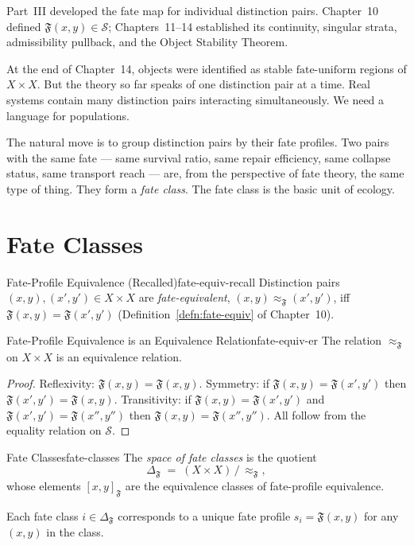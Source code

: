 \documentclass[12pt,twoside,openright]{book}
\newcommand{\fateClasses}{\Delta_{\mathfrak{F}}}
\newcommand{\fateMap}{\mathfrak{F}}
\newcommand{\fateSpace}{\mathcal{S}}
\newcommand{\fateClass}[1]{[#1]_{\mathfrak{F}}}
\newcommand{\fateUnif}{\text{fate-uniform}}
\providecommand{\fateUnif}{\text{fate-uniform}}
\providecommand{\fateClasses}{\Delta_{\mathfrak{F}}}
\providecommand{\fateClass}[1]{[#1]_{\mathfrak{F}}}
\begin{document}
Part~III developed the fate map for individual distinction
pairs. Chapter~10 defined $\fateMap(x,y)\in\fateSpace$;
Chapters~11--14 established its continuity, singular strata,
admissibility pullback, and the Object Stability Theorem.

At the end of Chapter~14, objects were identified as stable
$\fateUnif$ regions of $X\times X$. But the theory so far
speaks of one distinction pair at a time. Real systems contain
many distinction pairs interacting simultaneously. We need
a language for populations.

The natural move is to group distinction pairs by their fate
profiles. Two pairs with the same fate --- same survival ratio,
same repair efficiency, same collapse status, same transport
reach --- are, from the perspective of fate theory, the same
type of thing. They form a \emph{fate class}. The fate class
is the basic unit of ecology.

\section{Fate Classes}

\begin{definition}{Fate-Profile Equivalence (Recalled)}{fate-equiv-recall}
Distinction pairs $(x,y),(x',y')\in X\times X$ are
\emph{fate-equivalent}, $(x,y)\approx_\fateMap(x',y')$,
iff $\fateMap(x,y)=\fateMap(x',y')$
(Definition~\ref{defn:fate-equiv} of Chapter~10).
\end{definition}

\begin{proposition}{Fate-Profile Equivalence is an Equivalence
  Relation}{fate-equiv-er}
The relation $\approx_\fateMap$ on $X\times X$ is an
equivalence relation.
\begin{proof}
Reflexivity: $\fateMap(x,y)=\fateMap(x,y)$.
Symmetry: if $\fateMap(x,y)=\fateMap(x',y')$ then
$\fateMap(x',y')=\fateMap(x,y)$.
Transitivity: if $\fateMap(x,y)=\fateMap(x',y')$ and
$\fateMap(x',y')=\fateMap(x'',y'')$ then
$\fateMap(x,y)=\fateMap(x'',y'')$.
All follow from the equality relation on $\fateSpace$.
\end{proof}
\end{proposition}

\begin{definition}{Fate Classes}{fate-classes}
The \emph{space of fate classes} is the quotient
\[
  \fateClasses
  \;=\;
  (X\times X)\,/\,{\approx_\fateMap},
\]
whose elements $\fateClass{x,y}$ are the equivalence classes
of fate-profile equivalence.

Each fate class $i\in\fateClasses$ corresponds to a unique
fate profile $s_i=\fateMap(x,y)$ for any $(x,y)$ in the
class.
\end{definition}
\end{document}
